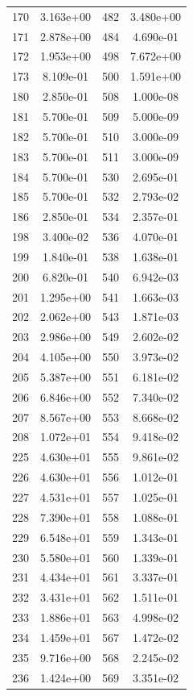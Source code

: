 \documentclass[12pt]{article}
\begin{document}
\begin{longtable}{@{}cccc@{}}
170 & 3.163e+00 & 482 & 3.480e+00 \\
171 & 2.878e+00 & 484 & 4.690e-01 \\
172 & 1.953e+00 & 498 & 7.672e+00 \\
173 & 8.109e-01 & 500 & 1.591e+00 \\
180 & 2.850e-01 & 508 & 1.000e-08 \\
181 & 5.700e-01 & 509 & 5.000e-09 \\
182 & 5.700e-01 & 510 & 3.000e-09 \\
183 & 5.700e-01 & 511 & 3.000e-09 \\
184 & 5.700e-01 & 530 & 2.695e-01 \\
185 & 5.700e-01 & 532 & 2.793e-02 \\
186 & 2.850e-01 & 534 & 2.357e-01 \\
198 & 3.400e-02 & 536 & 4.070e-01 \\
199 & 1.840e-01 & 538 & 1.638e-01 \\
200 & 6.820e-01 & 540 & 6.942e-03 \\
201 & 1.295e+00 & 541 & 1.663e-03 \\
202 & 2.062e+00 & 543 & 1.871e-03 \\
203 & 2.986e+00 & 549 & 2.602e-02 \\
204 & 4.105e+00 & 550 & 3.973e-02 \\
205 & 5.387e+00 & 551 & 6.181e-02 \\
206 & 6.846e+00 & 552 & 7.340e-02 \\
207 & 8.567e+00 & 553 & 8.668e-02 \\
208 & 1.072e+01 & 554 & 9.418e-02 \\
225 & 4.630e+01 & 555 & 9.861e-02 \\
226 & 4.630e+01 & 556 & 1.012e-01 \\
227 & 4.531e+01 & 557 & 1.025e-01 \\
228 & 7.390e+01 & 558 & 1.088e-01 \\
229 & 6.548e+01 & 559 & 1.343e-01 \\
230 & 5.580e+01 & 560 & 1.339e-01 \\
231 & 4.434e+01 & 561 & 3.337e-01 \\
232 & 3.431e+01 & 562 & 1.511e-01 \\
233 & 1.886e+01 & 563 & 4.998e-02 \\
234 & 1.459e+01 & 567 & 1.472e-02 \\
235 & 9.716e+00 & 568 & 2.245e-02 \\
236 & 1.424e+00 & 569 & 3.351e-02 \\

\end{longtable}
\end{document}
